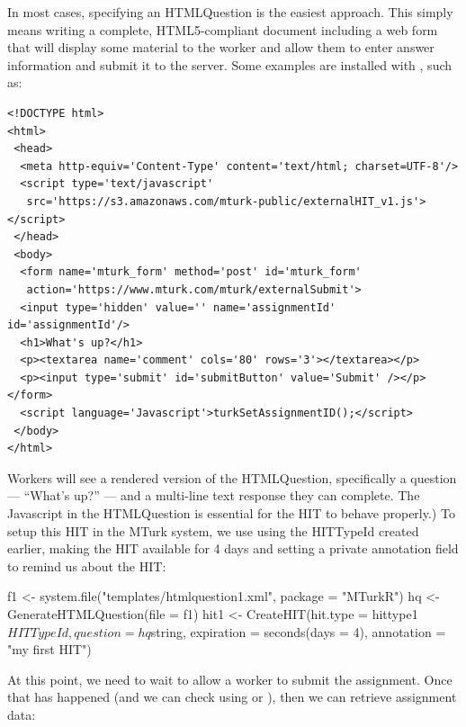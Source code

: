 In most cases, specifying an HTMLQuestion is the easiest approach. This simply means writing a complete, HTML5-compliant document including a web form that will display some material to the worker and allow them to enter answer information and submit it to the server. Some examples are installed with , such as:

\begin{verbatim}
<!DOCTYPE html>
<html>
 <head>
  <meta http-equiv='Content-Type' content='text/html; charset=UTF-8'/>
  <script type='text/javascript' 
   src='https://s3.amazonaws.com/mturk-public/externalHIT_v1.js'></script>
 </head>
 <body>
  <form name='mturk_form' method='post' id='mturk_form' 
   action='https://www.mturk.com/mturk/externalSubmit'>
  <input type='hidden' value='' name='assignmentId' id='assignmentId'/>
  <h1>What's up?</h1>
  <p><textarea name='comment' cols='80' rows='3'></textarea></p>
  <p><input type='submit' id='submitButton' value='Submit' /></p></form>
  <script language='Javascript'>turkSetAssignmentID();</script>
 </body>
</html>
\end{verbatim}

\noindent Workers will see a rendered version of the HTMLQuestion, specifically a question --- ``What's up?'' --- and a multi-line text response they can complete. The Javascript in the HTMLQuestion is essential for the HIT to behave properly.) To setup this HIT in the MTurk system, we use  using the HITTypeId created earlier, making the HIT available for 4 days and setting a private annotation field to remind us about the HIT:

\begin{example}
f1 <- system.file("templates/htmlquestion1.xml", package = "MTurkR")
hq <- GenerateHTMLQuestion(file = f1)
hit1 <- CreateHIT(hit.type = hittype1$HITTypeId, 
                  question = hq$string,
                  expiration = seconds(days = 4),
                  annotation = "my first HIT")
\end{example}

At this point, we need to wait to allow a worker to submit the assignment. Once that has happened (and we can check using  or ), then we can retrieve assignment data:


